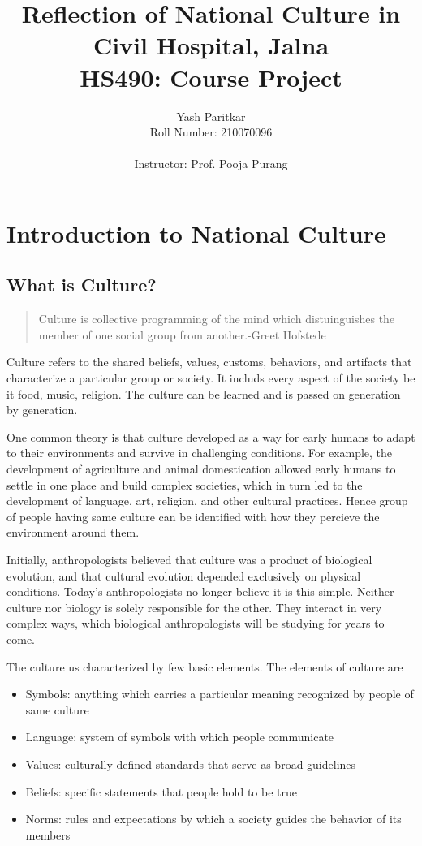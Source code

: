 \documentclass{article}
\title{\textbf{Reflection of National Culture in Civil Hospital, Jalna}\\
HS490: Course Project}
\author{Yash Paritkar\\
Roll Number: 210070096\\
\\
Instructor: Prof. Pooja Purang}
\begin{document}
\maketitle

\newpage
\tableofcontents

\newpage
\listoffigures
\newpage
\listoftables

\newpage
\section{Introduction to National Culture}
\subsection{What is Culture?}
\begin{quote}
    Culture is collective programming of the mind which distuinguishes the member of one social group from another.\hfill -Greet Hofstede
\end{quote}

Culture refers to the shared beliefs, values, customs, behaviors, and artifacts that characterize a particular group or society. It includs every aspect of the society be it food, music, religion. The culture can be learned and is passed on generation by generation.

One common theory is that culture developed as a way for early humans to adapt to their environments and survive in challenging conditions. For example, the development of agriculture and animal domestication allowed early humans to settle in one place and build complex societies, which in turn led to the development of language, art, religion, and other cultural practices. Hence group of people having same culture can be identified with how they percieve the environment around them.

Initially, anthropologists believed that culture was a product of biological evolution, and that cultural evolution depended exclusively on physical conditions. Today’s anthropologists no longer believe it is this simple. Neither culture nor biology is solely responsible for the other. They interact in very complex ways, which biological anthropologists will be studying for years to come.

The culture us characterized by few basic elements. The elements of culture are
\begin{itemize}
    \item Symbols: anything which carries a particular meaning recognized by people of same culture
    \item Language: system of symbols with which people communicate
    \item Values: culturally-defined standards that serve as broad guidelines
    \item Beliefs: specific statements that people hold to be true
    \item Norms: rules and expectations by which a society guides the behavior of its members
\end{itemize}
\end{document}
